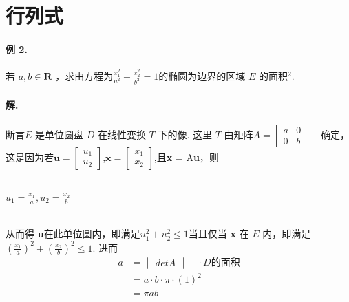 \documentclass[UTF8]{ctexart}
\begin{document}
\section{行列式}
\paragraph{例 2.} 若 $a,b \in \textbf{R}$ ，求由方程为$\frac{x_1^2}{a^2}+\frac{x_2^2}{b^2}=1$的椭圆为边界的区域 $E$ 的面积$^2$. 
\paragraph{解.} 断言$ E$ 是单位圆盘 $D$ 在线性变换 $T$ 下的像. 这里 $T$ 由矩阵$A=
\begin{bmatrix} a&0\\0&b \end{bmatrix} \quad$确定，这是因为若$\textbf{u}=\begin{bmatrix} u_1\\u_2 \end{bmatrix}$,$\textbf{x}=\begin{bmatrix} x_1\\x_2 \end{bmatrix}$,且\textbf{x}  = A\textbf{u}，则\\
\\
\centerline{$u_1=\frac{x_1}{a},u_2=\frac{x_2}{b}$}\\
从而得  \textbf{u}在此单位圆内，即满足$u_1^2+u_2^2\le1$当且仅当 \textbf{x} 在 $E$ 内，即满足  $(\frac{x_1}{a})^2+(\frac{x_2}{b})^2\le1$. 进而\\
\begin{align}
{a}& = \begin{vmatrix} det A\end{vmatrix} \quad·{D的面积} \\
&= a·b·π·(1)^2\\
&= \pi ab
\end{align}
\end{document}
